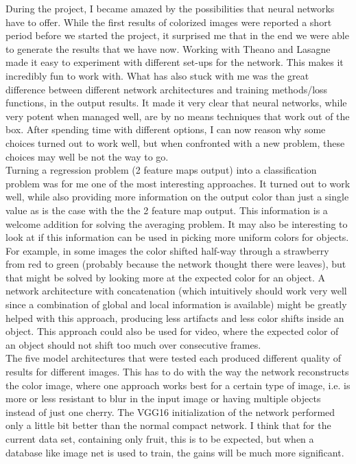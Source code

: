\documentclass[a4paper]{article}
\begin{document}
During the project, I became amazed by the possibilities that neural networks have to offer. While the first results of colorized images were reported a short period before we started the project, it surprised me that in the end we were able to generate the results that we have now. Working with Theano and Lasagne made it easy to experiment with different set-ups for the network. This makes it incredibly fun to work with. What has also stuck with me was the great difference between different network architectures and training methods/loss functions, in the output results. It made it very clear that neural networks, while very potent when managed well, are by no means techniques that work out of the box. After spending time with different options, I can now reason why some choices turned out to work well, but when confronted with a new problem, these choices may well be not the way to go.\\

Turning a regression problem (2 feature maps output) into a classification problem was for me one of the most interesting approaches. It turned out to work well, while also providing more information on the output color than just a single value as is the case with the the 2 feature map output. This information is a welcome addition for solving the averaging problem. It may also be interesting to look at if this information can be used in picking more uniform colors for objects. For example, in some images the color shifted half-way through a strawberry from red to green (probably because the network thought there were leaves), but that might be solved by looking more at the expected color for an object. A network architecture with concatenation (which intuitively should work very well since a combination of global and local information is available) might be greatly helped with this approach, producing less artifacts and less color shifts inside an object. This approach could also be used for video, where the expected color of an object should not shift too much over consecutive frames.\\

The five model architectures that were tested each produced different quality of results for different images. This has to do with the way the network reconstructs the color image, where one approach works best for a certain type of image, i.e. is more or less resistant to blur in the input image or having multiple objects instead of just one cherry.
The VGG16 initialization of the network performed only a little bit better than the normal compact network. I think that for the current data set, containing only fruit, this is to be expected, but when a database like image net is used to train, the gains will be much more significant.\\
\end{document}
